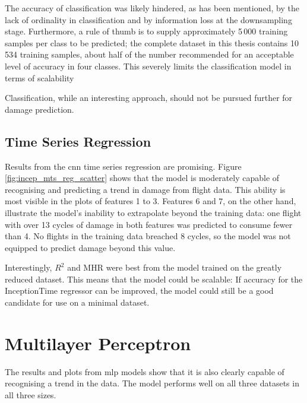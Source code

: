 The accuracy of classification was likely hindered, as has been mentioned, by the lack of ordinality in classification and by information loss at the downsampling stage. Furthermore, a rule of thumb \cite[]{goodfellow_deep_2016} is to supply approximately 5\,000 training samples per class to be predicted; the complete dataset in this thesis contains 10\,534 training samples, about half of the number recommended for an acceptable level of accuracy in four classes. This severely limits the classification model in terms of scalability

Classification, while an interesting approach, should not be pursued further for damage prediction.


\subsection{Time Series Regression}
Results from the \ac{cnn} time series regression are promising. Figure \ref{fig:incep_mts_reg_scatter} shows that the model is moderately capable of recognising and predicting a trend in damage from flight data. This ability is most visible in the plots of features 1 to 3. Features 6 and 7, on the other hand, illustrate the model's inability to extrapolate beyond the training data: one flight with over 13 cycles of damage in both features was predicted to consume fewer than 4. No flights in the training data breached 8 cycles, so the model was not equipped to predict damage beyond this value.

Interestingly, \(R^2\) and MHR were best from the model trained on the greatly reduced dataset. This means that the model could be scalable: If accuracy for the InceptionTime regressor can be improved, the model could still be a good candidate for use on a minimal dataset.

\section{Multilayer Perceptron}
The results and plots from \ac{mlp} models show that it is also clearly capable of recognising a trend in the data. The model performs well on all three datasets in all three sizes.

